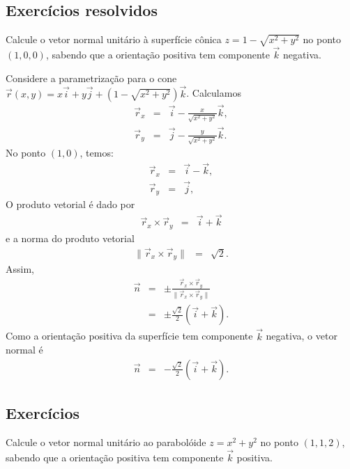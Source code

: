\subsection*{Exercícios resolvidos}

\begin{exeresol} 
Calcule o vetor normal unitário à superfície cônica $z=1-\sqrt{x^2+y^2}$ no ponto $(1,0,0)$, sabendo que a orientação positiva tem componente $\vec{k}$ negativa. 
\end{exeresol}
\begin{resol}
 Considere a parametrização para o cone $\vec{r}(x,y)=x\vec{i}+y\vec{j}+(1-\sqrt{x^2+y^2})\vec{k}$. Calculamos
\begin{eqnarray*}
\vec{r}_x&=&\vec{i}-\frac{x}{\sqrt{x^2+y^2}}\vec{k},\\
\vec{r}_y&=&\vec{j}-\frac{y}{\sqrt{x^2+y^2}}\vec{k}.
\end{eqnarray*}
No ponto $(1,0)$, temos:
\begin{eqnarray*}
\vec{r}_x&=&\vec{i}-\vec{k},\\
\vec{r}_y&=&\vec{j},
\end{eqnarray*}
O produto vetorial é dado por
\begin{eqnarray*}
\vec{r}_x\times \vec{r}_y&=&\vec{i}+\vec{k}
\end{eqnarray*}
e a norma do produto vetorial
\begin{eqnarray*}
\|\vec{r}_x\times \vec{r}_y\|&=&\sqrt{2}.
\end{eqnarray*}
Assim,
\begin{eqnarray*}
\vec{n}&=&\pm \frac{\vec{r}_x\times \vec{r}_y}{\|\vec{r}_x\times \vec{r}_y\|}\\
&=&\pm\frac{\sqrt{2}}{2}\left(\vec{i}+\vec{k}\right).
\end{eqnarray*}
Como a orientação positiva da superfície tem componente $\vec{k}$ negativa, o vetor normal é
\begin{eqnarray*}
\vec{n}&=&-\frac{\sqrt{2}}{2}\left(\vec{i}+\vec{k}\right).
\end{eqnarray*}
\end{resol}



\subsection*{Exercícios}
\begin{exer}
Calcule o vetor normal unitário ao parabolóide $z=x^2+y^2$ no ponto $(1,1,2)$, sabendo que a orientação positiva tem componente $\vec{k}$ positiva.  
\end{exer}


